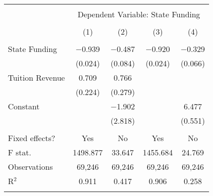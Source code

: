 
\begin{tabular}{@{\extracolsep{5pt}}lcccc} 
\\[-1.8ex]\hline 
\hline \\[-1.8ex] 
 & \multicolumn{4}{c}{Dependent Variable: State Funding} \\ 
\cline{2-5} 
\\[-1.8ex] & (1) & (2) & (3) & (4)\\ 
\hline \\[-1.8ex] 
 State Funding & $-$0.939 & $-$0.487 & $-$0.920 & $-$0.329 \\ 
  & (0.024) & (0.084) & (0.024) & (0.066) \\ 
  Tuition Revenue & 0.709 & 0.766 &  &  \\ 
  & (0.224) & (0.279) &  &  \\ 
  Constant &  & $-$1.902 &  & 6.477 \\ 
  &  & (2.818) &  & (0.551) \\ 
 \hline \\[-1.8ex] 
Fixed effects? & Yes & No & Yes & No \\ 
F stat. & 1498.877 & 33.647 & 1455.684 & 24.769 \\ 
Observations & 69,246 & 69,246 & 69,246 & 69,246 \\ 
R$^{2}$ & 0.911 & 0.417 & 0.906 & 0.258 \\ 
\hline 
\hline \\[-1.8ex] 
\end{tabular} 
